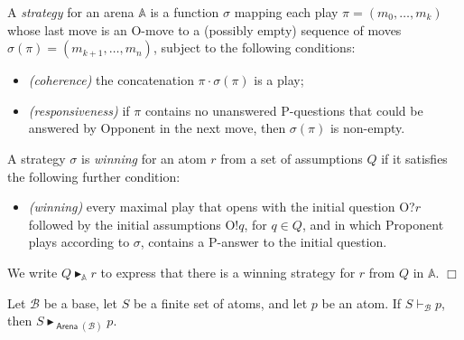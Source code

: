 \documentclass[10pt,a4paper]{amsart}
\newcommand{\arena}[1]{\mathbb{#1}}                     %
\newcommand{\base}[1]{\mathcal{#1}}                    %
\newcommand{\deriv}[1]{\vdash_{#1}}       %
\newcommand{\fillBox}{\hfill$\Box$}
\newcommand{\toarena}[1]{\mathrel{\textsf{Arena}}(#1)}           %
\newcommand{\wstrat}[1]{\blacktriangleright_{#1}}            %
\begin{document}
\begin{definition}[Strategy]
\label{def:strategy}
A \emph{strategy} for an arena $\arena{A}$ is a function $\sigma$ mapping
each play $\pi = (m_0,\ldots,m_k)$ whose last move is an O-move to
a (possibly empty) sequence of moves $\sigma(\pi) = (m_{k+1}, \ldots, m_n)$,
subject to the following conditions:
\begin{itemize}[align=left]
    \item \emph{(coherence)} the concatenation
          $\pi \cdot \sigma(\pi)$ is a play;
    \item \emph{(responsiveness)} if $\pi$ contains no unanswered P-questions that could be answered by Opponent in the next move, then $\sigma(\pi)$ is non-empty.
\end{itemize}
A strategy $\sigma$ is \emph{winning} for an atom $r$ from a set of
assumptions $Q$ if it satisfies the following further condition:
\begin{itemize}
    \item \emph{(winning)} every maximal play that opens with the initial
          question O?$r$ followed by the initial assumptions O!$q$, for
          $q \in Q$, and in which Proponent plays according to $\sigma$,
          contains a P-answer to the initial question.
\end{itemize}
We write $Q \wstrat{\arena{A}} r$ to express that there is a winning
strategy for $r$ from $Q$ in $\arena{A}$. \fillBox
\end{definition}

\begin{theorem}
\label{thm:game-soundness}
    Let $\base{B}$ be a base, let $S$ be a finite set of atoms, and let $p$
    be an atom. If $S \deriv{\base{B}} p$, then
    $S \wstrat{\toarena{\base{B}}} p$.
\end{theorem}
\end{document}
